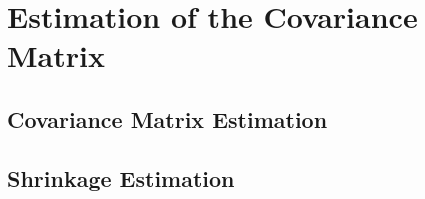 \chapter{Estimation of the Covariance Matrix}


\section{Covariance Matrix Estimation}

\section{Shrinkage Estimation}